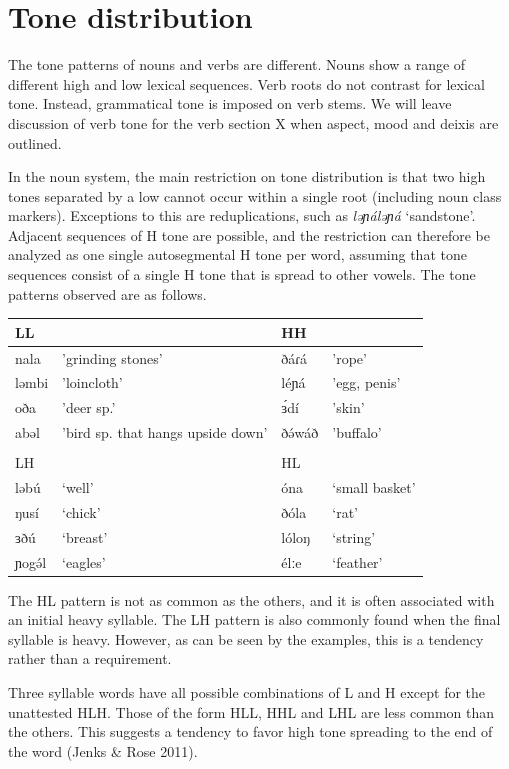 \section{Tone distribution}\label{sec:ch4:tonedist}
The tone patterns of nouns and verbs are different. Nouns show a range of different high and low lexical sequences. Verb roots do not contrast for lexical tone. Instead, grammatical tone is imposed on verb stems. We will leave discussion of verb tone for the verb section X when aspect, mood and deixis are outlined. 

In the noun system, the main restriction on tone distribution is that two high tones separated by a low cannot occur within a single root (including noun class markers). Exceptions to this are reduplications, such as \textit{ləɲáləɲá} ‘sandstone’. Adjacent sequences of H tone are possible, and the restriction can therefore be analyzed as one single autosegmental H tone per word, assuming that tone sequences consist of a single H tone that is spread to other vowels. The tone patterns observed are as follows.

\ea
\begin{tabular}[t]{llll}
LL	&	&	HH \\\hline
nala	&	'grinding stones'	&	ðáɾá	&	'rope'\\
ləmbi	&	'loincloth'			&	léɲá	&	'egg, penis'\\
oða		&	'deer sp.'			&	ɜ́dí		&	'skin'\\
abəl	&	'bird sp. that hangs upside down'	&	ðə́wáð	&	'buffalo'\\
&\\
LH	&	&	HL\\\hline
ləbú	&	‘well’	&	óna		&	‘small basket’\\
ŋusí	&	‘chick’	&	ðóla		&	‘rat’\\
ɜðú		&	‘breast’&	lóloŋ	&	‘string’\\
ɲogə́l	&	‘eagles’&	élːe	&	‘feather’\\
\end{tabular}
\z

The HL pattern is not as common as the others, and it is often associated with an initial heavy syllable. The LH pattern is also commonly found when the final syllable is heavy. However, as can be seen by the examples, this is a tendency rather than a requirement.

Three syllable words have all possible combinations of L and H except for the unattested HLH. Those of the form HLL, HHL and LHL are less common than the others. This suggests a tendency to favor high tone spreading to the end of the word (Jenks \& Rose 2011). 

